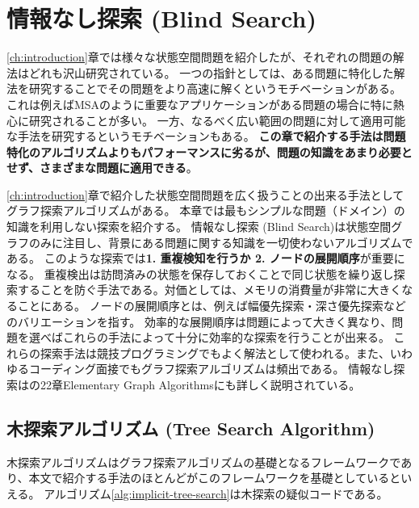 \chapter{情報なし探索 (Blind Search)}
\label{ch:blind-search}

\ref{ch:introduction}章では様々な状態空間問題を紹介したが、それぞれの問題の解法はどれも沢山研究されている。
一つの指針としては、ある問題に特化した解法を研究することでその問題をより高速に解くというモチベーションがある。
これは例えばMSAのように重要なアプリケーションがある問題の場合に特に熱心に研究されることが多い。
一方、なるべく広い範囲の問題に対して適用可能な手法を研究するというモチベーションもある。
{\bf この章で紹介する手法は問題特化のアルゴリズムよりもパフォーマンスに劣るが、問題の知識をあまり必要とせず、さまざまな問題に適用できる}。

\ref{ch:introduction}章で紹介した状態空間問題を広く扱うことの出来る手法としてグラフ探索アルゴリズムがある。
本章では最もシンプルな問題（ドメイン）の知識を利用しない探索を紹介する。
情報なし探索 (Blind Search)は状態空間グラフのみに注目し、背景にある問題に関する知識を一切使わないアルゴリズムである。
このような探索では{\bf 1. 重複検知を行うか 2. ノードの展開順序}が重要になる。
重複検出は訪問済みの状態を保存しておくことで同じ状態を繰り返し探索することを防ぐ手法である。対価としては、メモリの消費量が非常に大きくなることにある。
ノードの展開順序とは、例えば幅優先探索・深さ優先探索などのバリエーションを指す。
効率的な展開順序は問題によって大きく異なり、問題を選べばこれらの手法によって十分に効率的な探索を行うことが出来る。
これらの探索手法は競技プログラミングでもよく解法として使われる\cite{skiena2006programming}。また、いわゆるコーディング面接でもグラフ探索アルゴリズムは頻出である\cite{mcdowell2011cracking}。
情報なし探索は\cite{cormen01}の22章Elementary Graph Algorithmsにも詳しく説明されている。


\section{木探索アルゴリズム (Tree Search Algorithm)}
\label{sec:tree-search-algorithm}
木探索アルゴリズムはグラフ探索アルゴリズムの基礎となるフレームワークであり、本文で紹介する手法のほとんどがこのフレームワークを基礎としているといえる。
アルゴリズム\ref{alg:implicit-tree-search}は木探索の疑似コードである。

